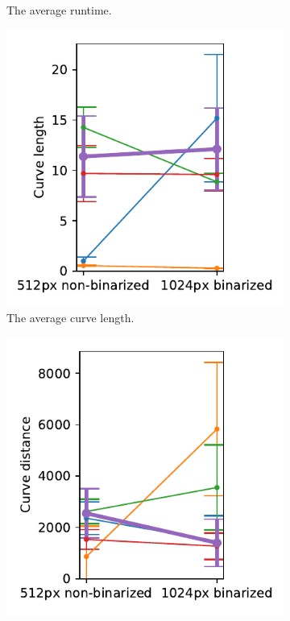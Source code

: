 \begin{figure}[h]
\begin{subfigure}{.3\textwidth}
    \caption{The average runtime.}
\end{subfigure}
    \begin{subfigure}{.3\textwidth}
    \centering
    \includegraphics[width=\textwidth]{graphics/eval/curve length_res_binarization_sketchbench.pdf}
    \caption{The average curve length.}
\end{subfigure}
    \begin{subfigure}{.3\textwidth}
    \centering
    \includegraphics[width=\textwidth]{graphics/eval/curve distance_res_binarization_sketchbench.pdf}

\end{subfigure}
\end{figure}
